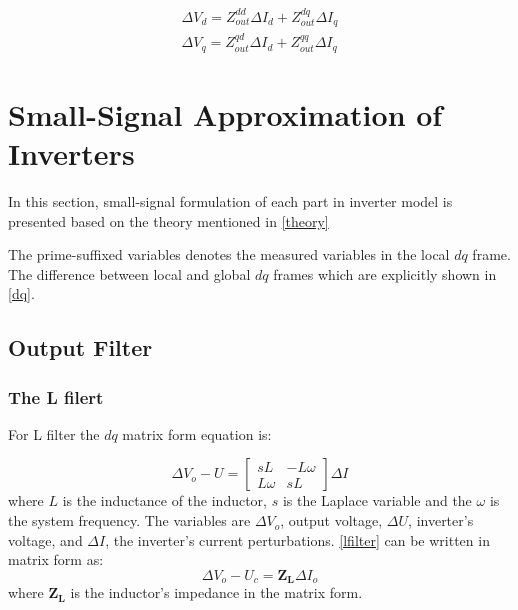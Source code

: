\begin{equation}
\begin{split}
\Delta V_d=Z^{dd}_{out} \Delta I_d+Z^{dq}_{out}\Delta I_q\\  \Delta V_q=Z^{qd}_{out}\Delta I_d+Z^{qq}_{out}\Delta I_q
\end{split}
\end{equation}




\section{Small-Signal Approximation of Inverters}\label{smallsignal}

In this section, small-signal formulation of each part in inverter model is presented based on the theory mentioned in \ref{theory}

The prime-suffixed variables denotes the measured variables in the local $dq$ frame. The difference between local and global $dq$ frames which are explicitly shown in \ref{dq}. 

\subsection{Output Filter}

\subsubsection{The L filert}
For L filter the $dq$ matrix form equation is:

\begin{equation}\label{lfilter}
\Delta V_o - U= \begin{bmatrix} sL & -L\omega \\ L\omega & sL\end{bmatrix}\Delta I
\end{equation}
where $L$ is the inductance of the inductor, $s$ is the Laplace variable and the $\omega$ is the system frequency. The variables are $\Delta V_o$, output voltage, $\Delta U$, inverter's voltage, and $\Delta I$, the inverter's current perturbations. \ref{lfilter} can be written in matrix form as:
\begin{equation}
\Delta V_o - U_c= \mathbf{Z_L} \Delta I_o
\end{equation}
where  $\mathbf{Z_L}$ is the inductor's impedance in the matrix form.
